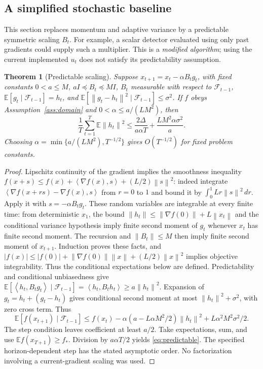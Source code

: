 \documentclass[11pt,a4paper]{article}
\newtheorem{theorem}{Theorem}[section]
\theoremstyle{definition}
\theoremstyle{remark}
\newcommand{\E}{\mathbb E}
\newcommand{\norm}[1]{\left\lVert#1\right\rVert}
\newcommand{\ip}[2]{\left\langle#1,#2\right\rangle}
\begin{document}
\subsection{A simplified stochastic baseline}\label{sec:simplified}
This section replaces momentum and adaptive variance by a predictable
symmetric scaling $B_t$. For example, a scalar detector evaluated using only
past gradients could supply such a multiplier. This is a \emph{modified
algorithm}; using the current implemented $u_t$ does not satisfy its
predictability assumption.

\begin{theorem}[Predictable scaling]\label{thm:predictable}
Suppose $x_{t+1}=x_t-\alpha B_tg_t$, with fixed constants $0<a\le M$,
$aI\preceq B_t\preceq MI$,
$B_t$ measurable with respect to $\mathcal F_{t-1}$,
$\E[g_t\mid\mathcal F_{t-1}]=h_t$, and
$\E[\norm{g_t-h_t}^2\mid\mathcal F_{t-1}]\le\sigma^2$.
If $f$ obeys Assumption~\ref{ass:domain} and $0<\alpha\le a/(LM^2)$, then
\begin{equation}\label{eq:predictable}
 \frac1T\sum_{t=1}^T\E\norm{h_t}^2
 \le\frac{2\Delta}{a\alpha T}+\frac{LM^2\alpha\sigma^2}{a}.
\end{equation}
Choosing $\alpha=\min\{a/(LM^2),T^{-1/2}\}$ gives $O(T^{-1/2})$ for fixed
problem constants.
\end{theorem}
\begin{proof}
Lipschitz continuity of the gradient implies the smoothness inequality
$f(x+s)\le f(x)+\ip{\nabla f(x)}s+(L/2)\norm s^2$: indeed integrate
$\ip{\nabla f(x+rs)-\nabla f(x)}s$ from $r=0$ to $1$ and bound it by
$\int_0^1 Lr\norm s^2\,dr$. Apply it with $s=-\alpha B_tg_t$.
These random variables are integrable at every finite time: from deterministic
$x_1$, the bound $\norm{h_t}\le\norm{\nabla f(0)}+L\norm{x_t}$ and the
conditional variance hypothesis imply finite second moment of $g_t$ whenever
$x_t$ has finite second moment. The recursion and $\norm{B_t}\le M$ then
imply finite second moment of $x_{t+1}$. Induction proves these facts, and
$|f(x)|\le |f(0)|+\norm{\nabla f(0)}\norm{x}+(L/2)\norm{x}^2$ implies
objective integrability. Thus the conditional expectations below are defined.
Predictability and conditional unbiasedness give
$\E[\ip{h_t}{B_tg_t}\mid\mathcal F_{t-1}]=\ip{h_t}{B_th_t}\ge a\norm{h_t}^2$.
Expansion of $g_t=h_t+(g_t-h_t)$ gives conditional second moment at most
$\norm{h_t}^2+\sigma^2$, with zero cross term. Thus
\[
 \E[f(x_{t+1})\mid\mathcal F_{t-1}]
 \le f(x_t)-\alpha(a-L\alpha M^2/2)\norm{h_t}^2
       +L\alpha^2M^2\sigma^2/2.
\]
The step condition leaves coefficient at least $a/2$. Take expectations,
sum, and use $\E f(x_{T+1})\ge f_*$. Division by $a\alpha T/2$ yields
\eqref{eq:predictable}. The specified horizon-dependent step has the stated
asymptotic order. No factorization involving a current-gradient scaling was
used.
\end{proof}
\end{document}

